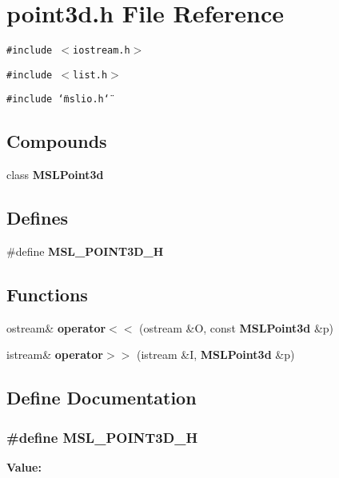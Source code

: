 \section{point3d.h File Reference}
\label{point3d_8h}
{\tt \#include $<$iostream.h$>$}\par
{\tt \#include $<$list.h$>$}\par
{\tt \#include \char`\"{}mslio.h\char`\"{}}\par
\subsection*{Compounds}
\begin{CompactItemize}
\item 
class {\bf MSLPoint3d}
\end{CompactItemize}
\subsection*{Defines}
\begin{CompactItemize}
\item 
\#define {\bf MSL\_\-POINT3D\_\-H}
\end{CompactItemize}
\subsection*{Functions}
\begin{CompactItemize}
\item 
ostream\& {\bf operator$<$$<$} (ostream \&O, const {\bf MSLPoint3d} \&p)
\item 
istream\& {\bf operator$>$$>$} (istream \&I, {\bf MSLPoint3d} \&p)
\end{CompactItemize}


\subsection{Define Documentation}
\subsubsection{\setlength{\rightskip}{0pt plus 5cm}\#define MSL\_\-POINT3D\_\-H}\label{point3d_8h_a0}


{\bf Value:}\footnotesize\begin{verbatim}
\end{verbatim}\normalsize 



